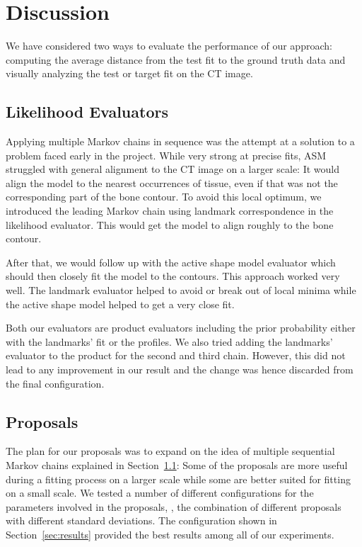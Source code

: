 \section{Discussion}
\label{sec:discussion}


We have considered two ways to evaluate the performance of our approach: computing the average distance from the test fit to the ground truth data and visually analyzing the test or target fit on the CT image. 


\subsection{Likelihood Evaluators}
\label{subsec:evaluators}

Applying multiple Markov chains in sequence was the attempt at a solution to a problem faced early in the project.
While very strong at precise fits, ASM struggled with general alignment to the CT image on a larger scale: It would align the model to the nearest occurrences of tissue, even if that was not the corresponding part of the bone contour.
To avoid this local optimum, we introduced the leading Markov chain using landmark correspondence in the likelihood evaluator.
This would get the model to align roughly to the bone contour. 

After that, we would follow up with the active shape model evaluator which should then closely fit the model to the contours. 
This approach worked very well. 
The landmark evaluator helped to avoid or break out of local minima while the active shape model helped to get a very close fit.

Both our evaluators are product evaluators including the prior probability either with the landmarks' fit or the profiles.
We also tried adding the landmarks' evaluator to the product for the second and third chain.
However, this did not lead to any improvement in our result and the change was hence discarded from the final configuration.


\subsection{Proposals}
\label{subsec:proposals}

The plan for our proposals was to expand on the idea of multiple sequential Markov chains explained in Section~\ref{subsec:evaluators}: Some of the proposals are more useful during a fitting process on a larger scale while some are better suited for fitting on a small scale. 
We tested a number of different configurations for the parameters involved in the proposals, \ie, the combination of different proposals with different standard deviations. 
The configuration shown in Section~\ref{sec:results} provided the best results among all of our experiments. 

